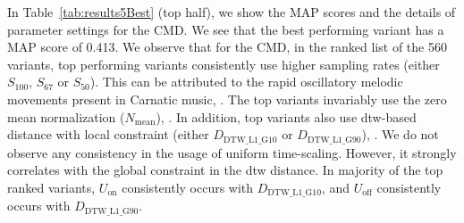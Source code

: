 In Table~\ref{tab:results5Best} (top half), we show the MAP scores and the details of parameter settings for the CMD. We see that the best performing variant has a MAP score of 0.413. We observe that for the CMD, in the ranked list of the 560 variants, top performing variants consistently use higher sampling rates (either  $S_{100}$, $S_{67}$ or $S_{50}$). This can be attributed to the rapid oscillatory melodic movements present in Carnatic music, . The top variants invariably use the zero mean normalization ($N_{\mathrm{mean}}$), . In addition, top variants also use \gls{dtw}-based distance with local constraint (either $D_{\mathrm{DTW\_L1\_G10}}$ or $D_{\mathrm{DTW\_L1\_G90}}$), . We do not observe any consistency in the usage of uniform time-scaling. However, it strongly correlates with the global constraint in the \gls{dtw} distance. In majority of the top ranked variants, $U_{\mathrm{on}}$ consistently occurs with $D_{\mathrm{DTW\_L1\_G10}}$, and $U_{\mathrm{off}}$ consistently occurs with $D_{\mathrm{DTW\_L1\_G90}}$. 


%




